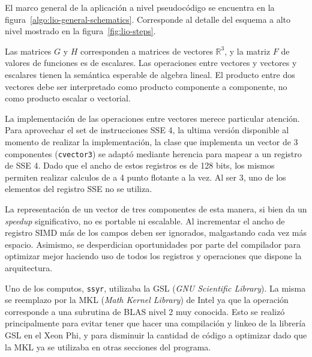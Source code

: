 El marco general de la aplicaci\'on a nivel pseudoc\'odigo se encuentra en la
figura~\ref{algo:lio-general-schematics}. Corresponde al detalle del esquema
a alto nivel mostrado en la figura~\ref{fig:lio-steps}.

Las matrices $G$ y $H$ corresponden a matrices de vectores $\mathbb{R}^3$, y
la matriz $F$ de valores de funciones es de escalares. Las operaciones entre
vectores y vectores y escalares tienen la sem\'antica esperable de algebra
lineal. El producto entre dos vectores debe ser interpretado como producto
componente a componente, no como producto escalar o vectorial.

La implementaci\'on de las operaciones entre vectores merece particular atenci\'on.
Para aprovechar el set de instrucciones SSE 4, la ultima versi\'on disponible al
momento de realizar la implementaci\'on, la clase que implementa un vector de 3
componentes (\texttt{cvector3}) se adapt\'o mediante herencia para mapear a un
registro de SSE 4. Dado que el ancho de estos registros es de 128 bits, los mismos
permiten realizar calculos de a 4 punto flotante a la vez. Al ser 3, uno de los
elementos del registro SSE no se utiliza.

La representaci\'on de un vector de tres componentes de esta manera, si bien da
un \textit{speedup} significativo, no es portable ni escalable. Al incrementar el
ancho de registro SIMD m\'as de los campos deben ser ignorados, malgastando cada
vez m\'as espacio. Asimismo, se desperdician oportunidades por parte del compilador
para optimizar mejor haciendo uso de todos los registros y operaciones que dispone
la arquitectura. 

Uno de los computos, \texttt{ssyr}, utilizaba la GSL (\textit{GNU Scientific Library}).
La misma se reemplazo por la MKL (\textit{Math Kernel Library}) de Intel ya que
la operaci\'on corresponde a una subrutina de BLAS nivel 2 muy conocida. Esto se
realiz\'o principalmente para evitar tener que hacer una compilaci\'on y linkeo
de la librer\'ia GSL en el Xeon Phi, y para disminuir la cantidad de c\'odigo a
optimizar dado que la MKL ya se utilizaba en otras secciones del programa.

